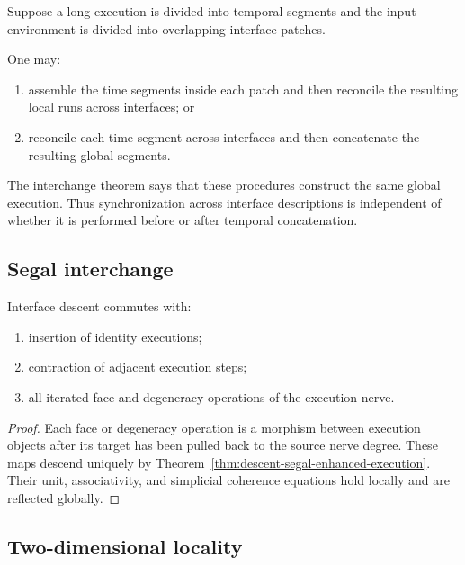 \begin{remark}
\label{rem:systems-interpretation-interchange}
Suppose a long execution is divided into temporal segments and the input
environment is divided into overlapping interface patches.

One may:
\begin{enumerate}
    \item assemble the time segments inside each patch and then reconcile the
    resulting local runs across interfaces; or
    \item reconcile each time segment across interfaces and then concatenate
    the resulting global segments.
\end{enumerate}

The interchange theorem says that these procedures construct the same global
execution. Thus synchronization across interface descriptions is independent
of whether it is performed before or after temporal concatenation.
\end{remark}

\subsection{Segal interchange}
\label{subsec:segal-interface-interchange}

\begin{theorem}
\label{thm:segal-interface-interchange}
Interface descent commutes with:
\begin{enumerate}
    \item insertion of identity executions;
    \item contraction of adjacent execution steps;
    \item all iterated face and degeneracy operations of the execution nerve.
\end{enumerate}
\end{theorem}

\begin{proof}
Each face or degeneracy operation is a morphism between execution objects
after its target has been pulled back to the source nerve degree. These maps
descend uniquely by
Theorem~\ref{thm:descent-segal-enhanced-execution}.
Their unit, associativity, and simplicial coherence equations hold locally
and are reflected globally.
\end{proof}

\subsection{Two-dimensional locality}
\label{subsec:two-dimensional-locality}

